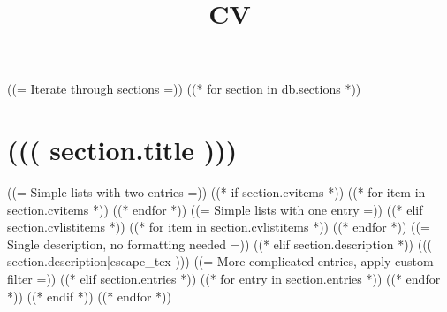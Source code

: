 \documentclass[10pt,a4paper,sans]{moderncv}
\title{CV}
\begin{document}
  \makecvtitle
  ((= Iterate through sections =))
  ((* for section in db.sections *))
  \section{((( section.title )))}
  ((= Simple lists with two entries =))
  ((* if section.cvitems *))
  ((* for item in section.cvitems *))
  ((* endfor *))
  ((= Simple lists with one entry =))
  ((* elif section.cvlistitems *))
  ((* for item in section.cvlistitems *))
  ((* endfor *))
  ((= Single description, no formatting needed =))
  ((* elif section.description *))
  ((( section.description|escape_tex )))
  ((= More complicated entries, apply custom filter =))
  ((* elif section.entries *))
  ((* for entry in section.entries *))
  ((* endfor *))
  ((* endif *))
  ((* endfor *))
\end{document}
